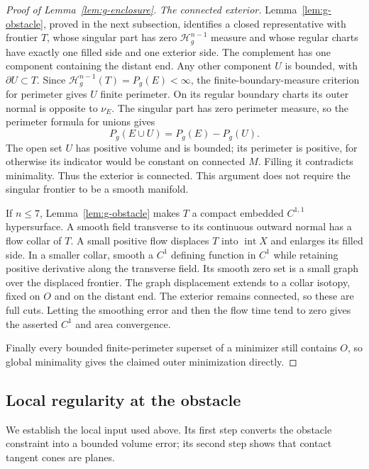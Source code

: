 \begin{proof}[Proof of Lemma~\ref{lem:g-enclosure}]
\emph{The connected exterior.}
Lemma~\ref{lem:g-obstacle}, proved in the next subsection, identifies a closed representative
with frontier $T$, whose singular part has zero
$\mathcal H^{n-1}_g$ measure and whose regular charts have exactly
one filled side and one exterior side.  The complement has one
component containing the distant end.  Any other component $U$ is
bounded, with $\partial U\subset T$.  Since
$\mathcal H^{n-1}_g(T)=P_g(E)<\infty$, the finite-boundary-measure
criterion for perimeter gives $U$ finite perimeter.  On its regular
boundary charts its outer normal is opposite to $\nu_E$.  The singular
part has zero perimeter measure, so the perimeter formula for unions
gives
\[
 P_g(E\cup U)=P_g(E)-P_g(U).
\]
The open set $U$ has positive volume and is bounded; its perimeter is
positive, for otherwise its indicator would be constant on connected
$M$.  Filling it contradicts minimality.  Thus the exterior is
connected.  This argument does not require the singular frontier to
be a smooth manifold.

If $n\le7$, Lemma~\ref{lem:g-obstacle} makes $T$ a compact embedded
$C^{1,1}$ hypersurface.  A smooth field transverse to its continuous
outward normal has a flow collar of $T$.  A small positive flow
displaces $T$ into $\operatorname{int}X$ and enlarges its filled side.
In a smaller collar, smooth a $C^1$ defining function in $C^1$ while
retaining positive derivative along the transverse field.  Its smooth
zero set is a small graph over the displaced frontier.  The graph
displacement extends to a collar isotopy, fixed on $O$ and on the
distant end.  The exterior remains connected, so these are full cuts.
Letting the smoothing error and then the flow time tend to zero gives
the asserted $C^1$ and area convergence.

Finally every bounded finite-perimeter superset of a minimizer still
contains $O$, so global minimality gives the claimed outer
minimization directly.
\end{proof}

\subsection{Local regularity at the obstacle}
\label{subsec:g-proof-obstacle}

We establish the local input used above. Its first step converts the
obstacle constraint into a bounded volume error; its second step shows
that contact tangent cones are planes.

